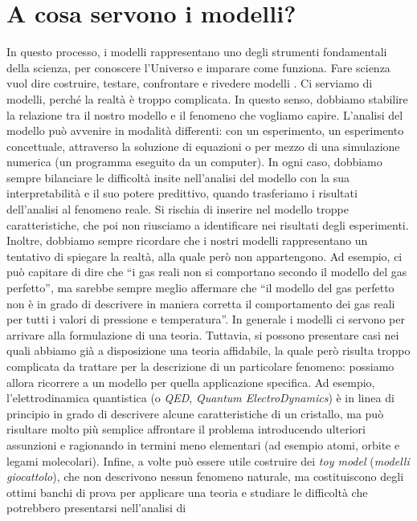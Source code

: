 \section*{A cosa servono i modelli?}
In questo processo, i modelli rappresentano uno degli strumenti fondamentali della scienza, per
conoscere l'Universo e imparare come funziona.
Fare scienza vuol dire costruire, testare, confrontare e rivedere modelli \cite{stnf}.
Ci serviamo di modelli, perché la realtà è troppo complicata. In questo senso, dobbiamo stabilire
la relazione tra il nostro modello e il fenomeno che vogliamo capire. L'analisi del modello può
avvenire in modalità differenti: con un esperimento, un esperimento concettuale, attraverso
la soluzione di equazioni o per mezzo di una simulazione numerica (un programma eseguito da un
computer).
In ogni caso, dobbiamo sempre bilanciare le difficoltà insite nell'analisi del modello con
la sua interpretabilità e il suo potere predittivo, quando trasferiamo i risultati
dell'analisi al fenomeno reale. Si rischia di inserire nel modello troppe caratteristiche, 
che poi non riusciamo a identificare nei risultati degli esperimenti. 
Inoltre, dobbiamo sempre ricordare che i nostri modelli rappresentano un tentativo di spiegare
la realtà, alla quale però non appartengono. Ad esempio, ci può capitare di dire che ``i gas reali non 
si comportano secondo il modello del gas perfetto'', ma sarebbe sempre meglio affermare che 
``il modello del gas perfetto non è in grado di descrivere in maniera corretta il comportamento
 dei gas reali per tutti i valori di pressione e temperatura''.
In generale i modelli ci servono per arrivare alla formulazione di una teoria. Tuttavia, si
possono presentare casi nei quali abbiamo già a disposizione una teoria affidabile, la quale però 
risulta troppo complicata da trattare per la descrizione di un particolare fenomeno: 
possiamo allora ricorrere a un
modello per quella applicazione specifica. Ad esempio, l'elettrodinamica quantistica (o \textsl{QED},
\textsl{Quantum ElectroDynamics}) è in linea di principio in grado di descrivere alcune
caratteristiche di un cristallo, ma può risultare molto più semplice affrontare il problema
introducendo ulteriori assunzioni e ragionando in termini meno elementari (ad esempio atomi, orbite 
e legami molecolari).
Infine, a volte può essere utile costruire dei \textsl{toy model} (\emph{modelli giocattolo}),
che non descrivono nessun fenomeno naturale, ma costituiscono degli ottimi banchi di prova
per applicare una teoria e studiare le difficoltà che potrebbero presentarsi nell'analisi di
